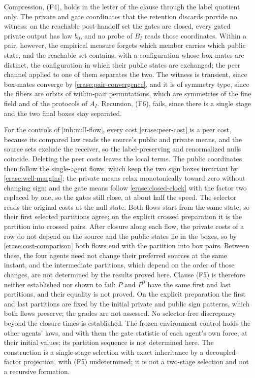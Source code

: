 Compression, (F4), holds in the letter of the clause through the label quotient only. The private and gate coordinates that the retention discards provide no witness: on the reachable post-handoff set the gates are closed, every gated private output has law $b_0$, and no probe of $B_I$ reads those coordinates. Within a pair, however, the empirical measure forgets which member carries which public state, and the reachable set contains, with a configuration whose box-mates are distinct, the configuration in which their public states are exchanged; the peer channel applied to one of them separates the two. The witness is transient, since box-mates converge by \cref{erase:pair-convergence}, and it is of symmetry type, since the fibers are orbits of within-pair permutations, which are symmetries of the fine field and of the protocols of $A_I$. Recursion, (F6), fails, since there is a single stage and the two final boxes stay separated.

For the controls of \cref{inh:null-flow}, every cost \cref{erase:peer-cost} is a peer cost, because its compared law reads the source's public and private means, and the source sets exclude the receiver, so the label-preserving and renormalized nulls coincide. Deleting the peer costs leaves the local terms. The public coordinates then follow the single-agent flows, which keep the two sign boxes invariant by \cref{erase:well-margins}; the private means relax monotonically toward zero without changing sign; and the gate means follow \cref{erase:closed-clock} with the factor two replaced by one, so the gates still close, at about half the speed. The selector reads the original costs at the null state. Both flows start from the same state, so their first selected partitions agree; on the explicit crossed preparation it is the partition into crossed pairs. After closure along each flow, the private costs of a row do not depend on the source and the public states lie in the boxes, so by \cref{erase:cost-comparison} both flows end with the partition into box pairs. Between these, the four agents need not change their preferred sources at the same instant, and the intermediate partitions, which depend on the order of those changes, are not determined by the results proved here. Clause (F5) is therefore neither established nor shown to fail: $P$ and $P^0$ have the same first and last partitions, and their equality is not proved. On the explicit preparation the first and last partitions are fixed by the initial private and public sign patterns, which both flows preserve; the grades are not assessed. No selector-free discrepancy beyond the closure times is established. The frozen-environment control holds the other agents' laws, and with them the gate statistic of each agent's own force, at their initial values; its partition sequence is not determined here. The construction is a single-stage selection with exact inheritance by a decoupled-factor projection, with (F5) undetermined; it is not a two-stage selection and not a recursive formation.
